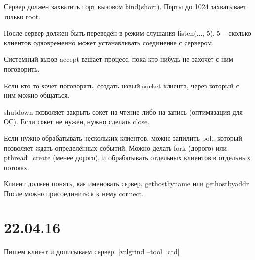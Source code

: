 \documentclass[a4paper,10pt]{article}
\begin{document}
Сервер должен захватить порт вызовом bind(short). Порты до 1024 захватывает только root.

После сервер должен быть переведён в режим слушания listen(..., 5). 5 -- сколько клиентов одновременно может устанавливать соединение с сервером.

Системный вызов accept вешает процесс, пока кто-нибудь не захочет с ним поговорить.

Если кто-то хочет поговорить, создать новый socket клиента, через который с ним можно общаться.

shutdown позволяет закрыть сокет на чтение либо на запись (оптимизация для ОС).
Если сокет не нужен, нужно сделать close.

Если нужно обрабатывать нескольких клиентов, можно запилить poll, который позволяет ждать определённых событий. 
Можно делать fork (дорого) или pthread\_create (менее дорого), и обрабатывать отдельных клиентов в отдельных потоках.

Клиент должен понять, как именовать сервер.
gethostbyname или gethostbyaddr
После можно присоединиться к нему connect.

\section{22.04.16}
Пишем клиент и дописываем сервер.
|valgrind --tool=dtd|
\end{document}
